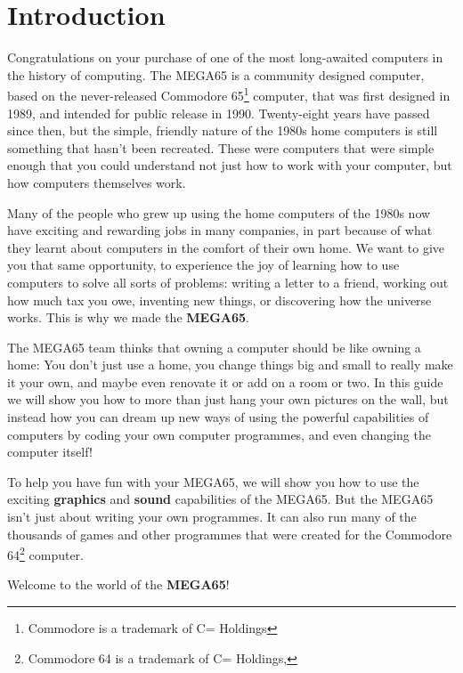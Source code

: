\chapter{Introduction}

Congratulations on your purchase of one of the most long-awaited computers in the history of computing.
The MEGA65 is a community designed computer, based on the never-released Commodore{\textregistered}
65\footnote{Commodore is a trademark of C= Holdings} computer, that was first designed in
1989, and intended for public release in 1990.  Twenty-eight years have passed since then,
but the simple, friendly nature of the 1980s home computers is still something that hasn't
been recreated.  These were computers that were simple enough that you could understand not just
how to work with your computer, but how computers themselves work.

Many of the people who grew
up using the home computers of the 1980s now have exciting and rewarding jobs in many companies,
in part because of what they learnt about computers in the comfort of their own home.  We
want to give you that same opportunity, to experience the joy of learning how
to use computers to solve all sorts of problems: writing a letter to a friend,
working out how much tax you owe, inventing new things, or discovering how the universe works.
This is why we made the {\bf MEGA65}.

The MEGA65 team thinks that owning a computer should
be like owning a home: You don't just use a home, you change things big and small to really
make it your own, and maybe even renovate it or add on a room or two.  In this guide we will
show you how to more than just hang your own pictures on the wall, but instead how you can dream
up new ways of using the powerful capabilities of computers by coding your own computer programmes,
and even changing the computer itself!

To help you have fun with your MEGA65, we will show you how to use the exciting {\bf graphics} and {\bf sound}
capabilities of the MEGA65.  But the MEGA65 isn't just about writing your own programmes.
It can also run many of the thousands of games and other programmes that were created for the
Commodore{\textregistered} 64{\texttrademark}\footnote{Commodore 64 is a trademark of C= Holdings, } computer.

Welcome to the world of the {\bf MEGA65}!
